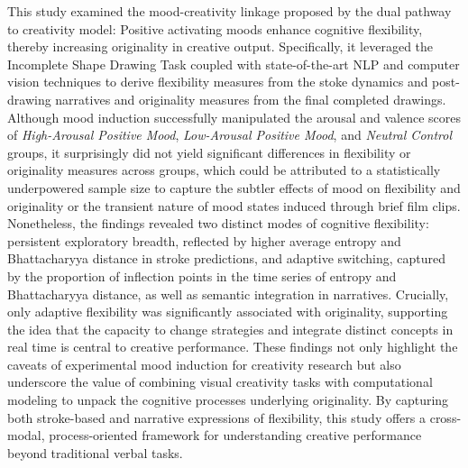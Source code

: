 \documentclass[../MA_Thesis.tex]{subfiles}
\begin{document}
This study examined the mood-creativity linkage proposed by the dual pathway to creativity model: Positive activating moods enhance cognitive flexibility, thereby increasing originality in creative output. Specifically, it leveraged the Incomplete Shape Drawing Task coupled with state-of-the-art NLP and computer vision techniques to derive flexibility measures from the stoke dynamics and post-drawing narratives and originality measures from the final completed drawings. Although mood induction successfully manipulated the arousal and valence scores of \textit{High-Arousal Positive Mood}, \textit{Low-Arousal Positive Mood}, and \textit{Neutral Control} groups, it surprisingly did not yield significant differences in flexibility or originality measures across groups, which could be attributed to a statistically underpowered sample size to capture the subtler effects of mood on flexibility and originality or the transient nature of mood states induced through brief film clips. Nonetheless, the findings revealed two distinct modes of cognitive flexibility: persistent exploratory breadth, reflected by higher average entropy and Bhattacharyya distance in stroke predictions, and adaptive switching, captured by the proportion of inflection points in the time series of entropy and Bhattacharyya distance, as well as semantic integration in narratives. Crucially, only adaptive flexibility was significantly associated with originality, supporting the idea that the capacity to change strategies and integrate distinct concepts in real time is central to creative performance. These findings not only highlight the caveats of experimental mood induction for creativity research but also underscore the value of combining visual creativity tasks with computational modeling to unpack the cognitive processes underlying originality. By capturing both stroke-based and narrative expressions of flexibility, this study offers a cross-modal, process-oriented framework for understanding creative performance beyond traditional verbal tasks. 
\end{document}
